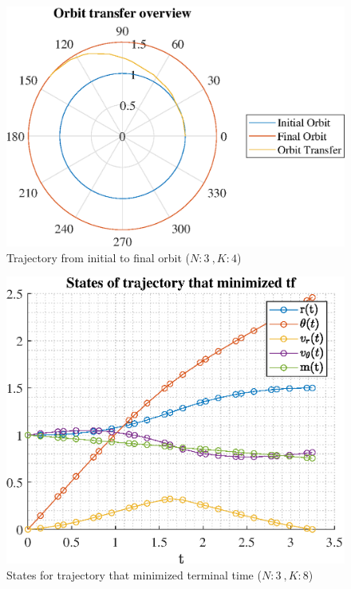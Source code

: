 \documentclass[]{article}
\begin{document}
	\begin{figure}
		\centering
		\includegraphics[scale=0.75]{orbit_N3_K4_C3_tf.eps}
		\caption{Trajectory from initial to final orbit (\(N:3\ , K:4\))}
		\label{fig:orbit_N3_K4_C3_tf}
	\end{figure}
	\begin{figure}
		\centering
		\includegraphics[scale=0.75]{states_N3_K8_C3_tf.eps}
		\caption{States for trajectory that minimized terminal time (\(N:3\ , K:8\))}
		\label{fig:states_N3_K8_C3_tf}
	\end{figure}
\end{document}
